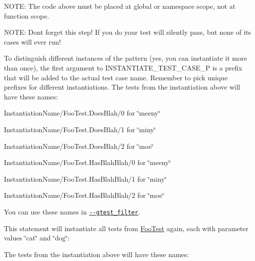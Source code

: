 N\+O\+TE\+: The code above must be placed at global or namespace scope, not at function scope.

N\+O\+TE\+: Don\textquotesingle{}t forget this step! If you do your test will silently pass, but none of its cases will ever run!

To distinguish different instances of the pattern (yes, you can instantiate it more than once), the first argument to {\ttfamily I\+N\+S\+T\+A\+N\+T\+I\+A\+T\+E\+\_\+\+T\+E\+S\+T\+\_\+\+C\+A\+S\+E\+\_\+P} is a prefix that will be added to the actual test case name. Remember to pick unique prefixes for different instantiations. The tests from the instantiation above will have these names\+:


\begin{DoxyItemize}
\item {\ttfamily Instantiation\+Name/\+Foo\+Test.\+Does\+Blah/0} for {\ttfamily \char`\"{}meeny\char`\"{}}
\item {\ttfamily Instantiation\+Name/\+Foo\+Test.\+Does\+Blah/1} for {\ttfamily \char`\"{}miny\char`\"{}}
\item {\ttfamily Instantiation\+Name/\+Foo\+Test.\+Does\+Blah/2} for {\ttfamily \char`\"{}moe\char`\"{}}
\item {\ttfamily Instantiation\+Name/\+Foo\+Test.\+Has\+Blah\+Blah/0} for {\ttfamily \char`\"{}meeny\char`\"{}}
\item {\ttfamily Instantiation\+Name/\+Foo\+Test.\+Has\+Blah\+Blah/1} for {\ttfamily \char`\"{}miny\char`\"{}}
\item {\ttfamily Instantiation\+Name/\+Foo\+Test.\+Has\+Blah\+Blah/2} for {\ttfamily \char`\"{}moe\char`\"{}}
\end{DoxyItemize}

You can use these names in \href{\#running-a-subset-of-the-tests}{\texttt{ {\ttfamily -\/-\/gtest\+\_\+filter}}}.

This statement will instantiate all tests from {\ttfamily \mbox{\hyperlink{classFooTest}{Foo\+Test}}} again, each with parameter values {\ttfamily \char`\"{}cat\char`\"{}} and {\ttfamily \char`\"{}dog\char`\"{}}\+:


\begin{DoxyCode}{0}
\end{DoxyCode}


The tests from the instantiation above will have these names\+:


